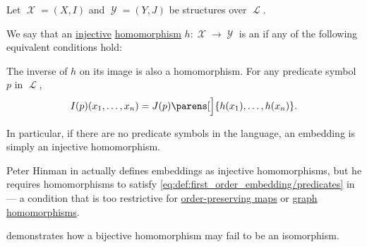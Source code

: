 \begin{definition}\label{def:first_order_embedding}
  Let \( \mscrX = (X, I) \) and \( \mscrY = (Y, J) \) be structures over \( \mscrL \).

  We say that an \hyperref[def:function_invertibility/injective]{injective} \hyperref[def:first_order_homomorphism]{homomorphism} \( h: \mscrX \to \mscrY \) is an  if any of the following equivalent conditions hold:

  \begin{thmenum}
     The inverse of \( h \) on its image is also a homomorphism.
     For any predicate symbol \( p \) in \( \mscrL \),
    \begin{equation}\label{eq:def:first_order_embedding/predicates}
      I(p) (x_1, \ldots, x_n) = J(p) \parens[\Big]{ h(x_1), \ldots, h(x_n) }.
    \end{equation}
  \end{thmenum}
\end{definition}
\begin{comments}
  \item In particular, if there are no predicate symbols in the language, an embedding is simply an injective homomorphism.

  \item Peter Hinman in  actually defines embeddings as injective homomorphisms, but he requires homomorphisms to satisfy \eqref{eq:def:first_order_embedding/predicates} in \cite[def. 2.3.26(i)]{Hinman2005} --- a condition that is too restrictive for \hyperref[def:order_function]{order-preserving maps} or \hyperref[def:directed_graph/homomorphism]{graph homomorphisms}.

  \item {} demonstrates how a bijective homomorphism may fail to be an isomorphism.
\end{comments}
